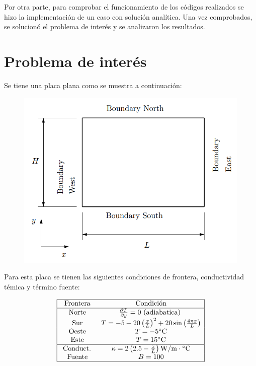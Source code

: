 \documentclass[article,latterpaper]{article}
\begin{document}
\vspace{1.5 cm}

Por otra parte, para comprobar el funcionamiento de los códigos realizados se hizo la implementación de un caso con solución analítica. Una vez comprobados, se solucionó el problema de interés y se analizaron los resultados.

\section{Problema de interés}
Se tiene una placa plana como se muestra a continuación:

\begin{figure}[H]
    \centering
    \includegraphics[scale=0.3]{Prob_CFD1.png}
    \caption{ }
    \label{Dom_cp}
\end{figure}

Para esta placa se tienen las siguientes condiciones de frontera, conductividad témica y término fuente:

$$
\begin{array}{|cc|}
    \hline \text { Frontera } & \text { Condición } \\
    \hline \text { Norte } & \frac{\partial T}{\partial y}=0 \text { (adiabatica) } \\
    \text { Sur } & T=-5+20\left(\frac{x}{L}\right)^2+20 \sin \left(\frac{4 \pi x}{L}\right) \\
    \text { Oeste } & T=-5^{\circ} \mathrm{C} \\
    \text { Este } & T=15^{\circ} \mathrm{C} \\
    \hline \text { Conduct. } & \kappa=2\left(2.5-\frac{x}{L}\right) \mathrm{W} / \mathrm{m} \cdot{ }^{\circ} \mathrm{C} \\
    \text { Fuente } & B=100 \\
    \hline
\end{array}
$$
\end{document}
